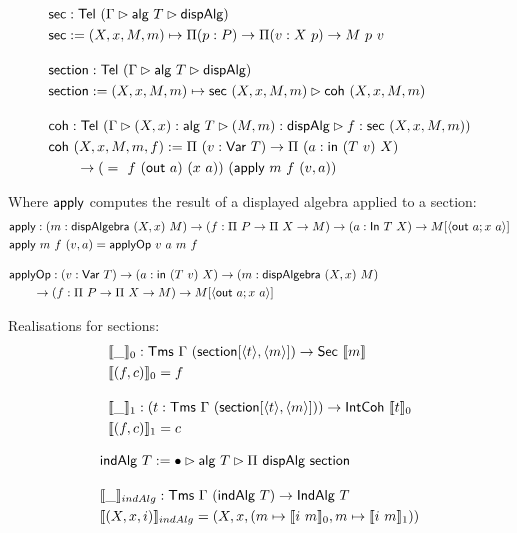 \begin{align*}
&\mta{sec} : \Tel\ (\Gamma \rhd \mta{alg}\ T \rhd \mta{dispAlg}) \\
&\mta{sec} := (X, x, M, m) \mapsto \Pi (p : P) \to \Pi (v : X\ p) \to M\ p\ v \\[1em]
&\mta{section} : \Tel\ (\Gamma \rhd \mta{alg}\ T \rhd \mta{dispAlg}) \\
&\mta{section} := (X, x, M, m) \mapsto \mta{sec}\ (X, x, M, m) \rhd \mta{coh}\ (X, x, M, m) \\[1em]
&\mta{coh} : \Tel\ (\Gamma \rhd (X, x) : \mta{alg}\ T \rhd (M, m) : \mta{dispAlg} \rhd f : \mta{sec}\ (X, x, M, m)) \\
&\mta{coh}\ (X, x, M, m, f) := \Pi\ (v : \mta{Var}\ T) \to \Pi\ (a : \mta{in}\ (T\ v)\ X) \\
&\qquad \to \Id\ (f\ (\mta{out}\ a)\ (x\ a))\ (\mta{apply}\ m\ f\ (v, a))
\end{align*}

Where $\textsf{apply}$ computes the result of a displayed algebra applied to a section:
\begin{align*}
&\mta{apply} : (m : \mta{dispAlgebra}\ (X, x)\ M) \to (f : \Pi\ P \to \Pi\ X \to M) \to (a : \mta{In}\ T\ X) \to M[\Msub{\mta{out}\ a; x\ a}] \\
&\mta{apply}\ m\ f\ (v, a) = \mta{applyOp}\ v\ a\ m\ f \\[1em]
&\mta{applyOp} : (v : \mta{Var}\ T) \to (a : \mta{in}\ (T\ v)\ X) \to (m : \mta{dispAlgebra}\ (X, x)\ M) \\
&\qquad \to (f : \Pi\ P \to \Pi\ X \to M) \to M[\Msub{\mta{out}\ a; x\ a}]
\end{align*}

Realisations for sections:
\begin{align*}
&\llbracket\_\rrbracket_0 : \Tms\ \Gamma\ (\mta{section}[\Msub{t},\Msub{m}]) \to \mta{Sec}\ \llbracket m \rrbracket \\
&\llbracket (f, c) \rrbracket_0 = f \\[1em]
&\llbracket\_\rrbracket_1 : (t : \Tms\ \Gamma\ (\mta{section}[\Msub{t},\Msub{m}])) \to \mta{IntCoh}\ \llbracket t \rrbracket_0 \\
&\llbracket (f, c) \rrbracket_1 = c
\end{align*}

\begin{align*}
&\mta{indAlg}\ T := \bullet \rhd \mta{alg}\ T \rhd \Pi\ \mta{dispAlg}\ \mta{section} \\[1em]
&\llbracket\_\rrbracket_{indAlg} : \Tms\ \Gamma\ (\mta{indAlg}\ T) \to \mta{IndAlg}\ T \\
&\llbracket (X, x, i) \rrbracket_{indAlg} = (X, x, (m \mapsto \llbracket i\ m \rrbracket_0, m \mapsto \llbracket i\ m \rrbracket_1))
\end{align*}

